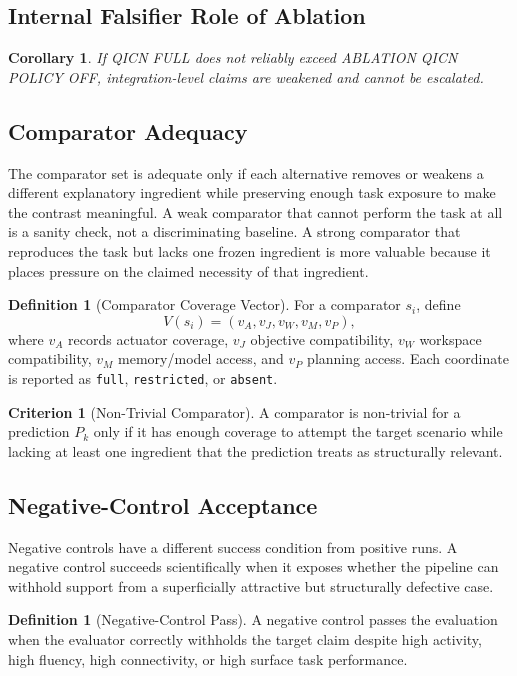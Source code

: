 \documentclass[11pt,a4paper]{article}
\newtheorem{corollary}[theorem]{Corollary}
\theoremstyle{definition}
\newtheorem{definition}[theorem]{Definition}
\newtheorem{criterion}[theorem]{Criterion}
\begin{document}
\subsection{Internal Falsifier Role of Ablation}
\begin{corollary}
If QICN FULL does not reliably exceed ABLATION QICN POLICY OFF, integration-level claims are weakened and cannot be escalated.
\end{corollary}

\subsection{Comparator Adequacy}
The comparator set is adequate only if each alternative removes or weakens a
different explanatory ingredient while preserving enough task exposure to make the
contrast meaningful. A weak comparator that cannot perform the task at all is a
sanity check, not a discriminating baseline. A strong comparator that reproduces
the task but lacks one frozen ingredient is more valuable because it places
pressure on the claimed necessity of that ingredient.

\begin{definition}[Comparator Coverage Vector]
For a comparator $s_i$, define
\[
V(s_i)=(v_A,v_J,v_W,v_M,v_P),
\]
where $v_A$ records actuator coverage, $v_J$ objective compatibility, $v_W$
workspace compatibility, $v_M$ memory/model access, and $v_P$ planning access.
Each coordinate is reported as \texttt{full}, \texttt{restricted}, or
\texttt{absent}.
\end{definition}

\begin{criterion}[Non-Trivial Comparator]
A comparator is non-trivial for a prediction $P_k$ only if it has enough coverage
to attempt the target scenario while lacking at least one ingredient that the
prediction treats as structurally relevant.
\end{criterion}

\subsection{Negative-Control Acceptance}
Negative controls have a different success condition from positive runs. A
negative control succeeds scientifically when it exposes whether the pipeline can
withhold support from a superficially attractive but structurally defective case.

\begin{definition}[Negative-Control Pass]
A negative control passes the evaluation when the evaluator correctly withholds
the target claim despite high activity, high fluency, high connectivity, or high
surface task performance.
\end{definition}
\end{document}
